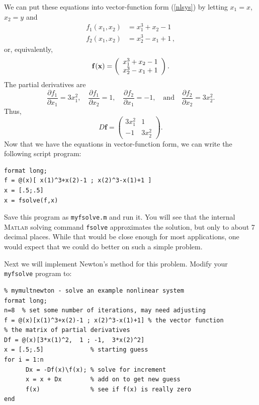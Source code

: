 We can put these equations into vector-function form (\ref{nlsys})
by letting $x_1 = x$,
$x_2 = y$ and
\begin{equation*}
\begin{split}
f_1(x_1,x_2) &= x_1^3 + x_2 - 1 \\
f_2(x_1,x_2) &= x_2^3 - x_1 + 1\,,
\end{split}
\end{equation*}
or, equivalently,
\begin{equation*}
\mathbf{f}(\mathbf{x}) = \left(\begin{array}{c}
                   x_1^3 + x_2 - 1 \\
                   x_2^3 - x_1 + 1
                  \end{array} \right).
\end{equation*}
The partial derivatives are
\begin{equation}
\label{eqn:partials}
\frac{\partial f_1}{\partial x_1} = 3 x_1^2, 
\quad \frac{\partial f_1}{\partial x_2} = 1, 
\quad \frac{\partial f_2}{\partial x_1} = -1,  
\quad\text{and}\quad \frac{\partial f_2}{\partial x_2} = 3 x_2^2.
\end{equation}
Thus,
\begin{equation}
\label{eqn:Dfexample}
D \mathbf{f} =  \left(\begin{array}{cc}
                   3x_1^2 & 1 \\
                    -1 & 3x_2^2 
                  \end{array} \right).
\end{equation}
Now that we have the equations in  vector-function form,
we can write the following script program:
\begin{lstlisting}
format long;
f = @(x)[ x(1)^3+x(2)-1 ; x(2)^3-x(1)+1 ]
x = [.5;.5]
x = fsolve(f,x)
\end{lstlisting}
Save this program as \verb&myfsolve.m& and run it.
You will see that the internal \textsc{Matlab} solving
command \verb&fsolve& approximates the solution, but
only to about 7 decimal places. While that would be close enough
for most applications, one would expect that we could do
better on such a simple problem.

Next we will implement Newton's method for this problem.
Modify your \verb&myfsolve& program to:
\begin{lstlisting}
% mymultnewton - solve an example nonlinear system
format long;
n=8  % set some number of iterations, may need adjusting
f = @(x)[x(1)^3+x(2)-1 ; x(2)^3-x(1)+1] % the vector function
% the matrix of partial derivatives
Df = @(x)[3*x(1)^2,  1 ; -1,  3*x(2)^2] 
x = [.5;.5]             % starting guess
for i = 1:n
      Dx = -Df(x)\f(x); % solve for increment
      x = x + Dx        % add on to get new guess
      f(x)              % see if f(x) is really zero
end
\end{lstlisting}

